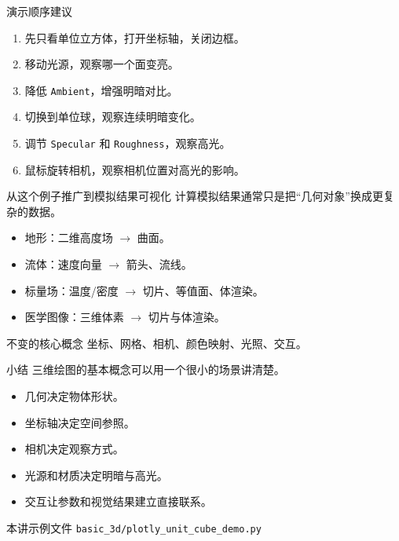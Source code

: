 \documentclass[aspectratio=169,11pt]{ctexbeamer}
\begin{document}


\begin{frame}{演示顺序建议}
  \begin{enumerate}
    \item 先只看单位立方体，打开坐标轴，关闭边框。
    \item 移动光源，观察哪一个面变亮。
    \item 降低 \texttt{Ambient}，增强明暗对比。
    \item 切换到单位球，观察连续明暗变化。
    \item 调节 \texttt{Specular} 和 \texttt{Roughness}，观察高光。
    \item 鼠标旋转相机，观察相机位置对高光的影响。
  \end{enumerate}
\end{frame}

\begin{frame}{从这个例子推广到模拟结果可视化}
  计算模拟结果通常只是把“几何对象”换成更复杂的数据。

  \begin{itemize}
    \item 地形：二维高度场 \(\rightarrow\) 曲面。
    \item 流体：速度向量 \(\rightarrow\) 箭头、流线。
    \item 标量场：温度/密度 \(\rightarrow\) 切片、等值面、体渲染。
    \item 医学图像：三维体素 \(\rightarrow\) 切片与体渲染。
  \end{itemize}

  \begin{block}{不变的核心概念}
    坐标、网格、相机、颜色映射、光照、交互。
  \end{block}
\end{frame}

\begin{frame}{小结}
  三维绘图的基本概念可以用一个很小的场景讲清楚。

  \begin{itemize}
    \item 几何决定物体形状。
    \item 坐标轴决定空间参照。
    \item 相机决定观察方式。
    \item 光源和材质决定明暗与高光。
    \item 交互让参数和视觉结果建立直接联系。
  \end{itemize}

  \begin{block}{本讲示例文件}
    \texttt{basic\_3d/plotly\_unit\_cube\_demo.py}
  \end{block}
\end{frame}
\end{document}
